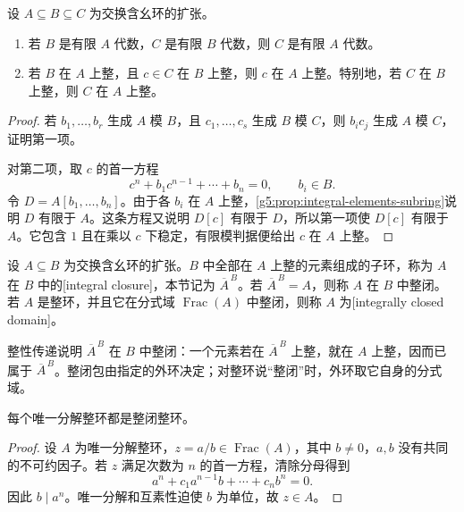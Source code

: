 \begin{proposition}
\label{g5:prop:integrality-transitive}
	设 \(A\subseteq B\subseteq C\) 为交换含幺环的扩张。
	\begin{enumerate}
		\item 若 \(B\) 是有限 \(A\) 代数，\(C\) 是有限 \(B\) 代数，则 \(C\) 是有限 \(A\) 代数。
		\item 若 \(B\) 在 \(A\) 上整，且 \(c\in C\) 在 \(B\) 上整，则 \(c\) 在 \(A\) 上整。特别地，若 \(C\) 在 \(B\) 上整，则 \(C\) 在 \(A\) 上整。
	\end{enumerate}
\end{proposition}
\begin{proof}
	若 \(b_1,\ldots,b_r\) 生成 \(A\) 模 \(B\)，且 \(c_1,\ldots,c_s\) 生成 \(B\) 模 \(C\)，则 \(b_ic_j\) 生成 \(A\) 模 \(C\)，证明第一项。

	对第二项，取 \(c\) 的首一方程
	\[
		c^n+b_1c^{n-1}+\cdots+b_n=0,\qquad b_i\in B.
	\]
	令 \(D=A[b_1,\ldots,b_n]\)。由于各 \(b_i\) 在 \(A\) 上整，\cref{g5:prop:integral-elements-subring}说明 \(D\) 有限于 \(A\)。这条方程又说明 \(D[c]\) 有限于 \(D\)，所以第一项使 \(D[c]\) 有限于 \(A\)。它包含 \(1\) 且在乘以 \(c\) 下稳定，有限模判据便给出 \(c\) 在 \(A\) 上整。
\end{proof}

\begin{definition}
\label{g5:def:integral-closure}
	设 \(A\subseteq B\) 为交换含幺环的扩张。\(B\) 中全部在 \(A\) 上整的元素组成的子环，称为 \(A\) 在 \(B\) 中的[integral closure]，本节记为 \(\overline A^{\,B}\)。若 \(\overline A^{\,B}=A\)，则称 \(A\) 在 \(B\) 中整闭。若 \(A\) 是整环，并且它在分式域 \(\operatorname{Frac}(A)\) 中整闭，则称 \(A\) 为[integrally closed domain]。
\end{definition}

整性传递说明 \(\overline A^{\,B}\) 在 \(B\) 中整闭：一个元素若在 \(\overline A^{\,B}\) 上整，就在 \(A\) 上整，因而已属于 \(\overline A^{\,B}\)。整闭包由指定的外环决定；对整环说“整闭”时，外环取它自身的分式域。

\begin{proposition}
\label{g5:prop:ufd-integrally-closed}
	每个唯一分解整环都是整闭整环。
\end{proposition}
\begin{proof}
	设 \(A\) 为唯一分解整环，\(z=a/b\in\operatorname{Frac}(A)\)，其中 \(b\ne0\)，\(a,b\) 没有共同的不可约因子。若 \(z\) 满足次数为 \(n\) 的首一方程，清除分母得到
	\[
		a^n+c_1a^{n-1}b+\cdots+c_nb^n=0.
	\]
	因此 \(b\mid a^n\)。唯一分解和互素性迫使 \(b\) 为单位，故 \(z\in A\)。
\end{proof}

